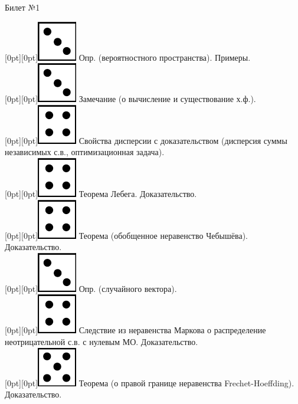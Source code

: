 \documentclass[10pt]{article}
\begin{document}
 
\begin{center} {\Large Билет №1} \end{center} 

\raisebox{-1pt}[0pt][0pt]{\includegraphics[width=0.02\linewidth]{3.png}} Опр. (вероятностного пространства). Примеры. \\

\raisebox{-1pt}[0pt][0pt]{\includegraphics[width=0.02\linewidth]{3.png}} Замечание (о вычисление и существование х.ф.). \\

\raisebox{-1pt}[0pt][0pt]{\includegraphics[width=0.02\linewidth]{4.png}} Свойства дисперсии с доказательством (дисперсия суммы независимых с.в., оптимизационная задача). \\ 

\raisebox{-1pt}[0pt][0pt]{\includegraphics[width=0.02\linewidth]{4.png}} Теорема Лебега. Доказательство. \\

\raisebox{-1pt}[0pt][0pt]{\includegraphics[width=0.02\linewidth]{4.png}} Теорема (обобщенное неравенство Чебышёва). Доказательство. \\
\raisebox{-1pt}[0pt][0pt]{\includegraphics[width=0.02\linewidth]{3.png}} Опр. (случайного вектора). \\

\raisebox{-1pt}[0pt][0pt]{\includegraphics[width=0.02\linewidth]{4.png}} Следствие из неравенства Маркова о распределение неотрицательной с.в. с нулевым МО. Доказательство. \\

\raisebox{-1pt}[0pt][0pt]{\includegraphics[width=0.02\linewidth]{5.png}} Теорема (о правой границе неравенства Frechet-Hoeffding).  Доказательство. \\
\end{document}
